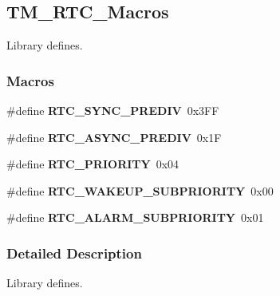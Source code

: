 \hypertarget{group___t_m___r_t_c___macros}{}\subsection{T\+M\+\_\+\+R\+T\+C\+\_\+\+Macros}
\label{group___t_m___r_t_c___macros}


Library defines.  


\subsubsection*{Macros}
\begin{DoxyCompactItemize}
\item 
\hypertarget{group___t_m___r_t_c___macros_gad70ee12b5ccfad457097f59f53fde8c5}{}\#define {\bfseries R\+T\+C\+\_\+\+S\+Y\+N\+C\+\_\+\+P\+R\+E\+D\+I\+V}~0x3\+F\+F\label{group___t_m___r_t_c___macros_gad70ee12b5ccfad457097f59f53fde8c5}

\item 
\hypertarget{group___t_m___r_t_c___macros_ga7b5190a28d7fb1b660e11d4330bd4628}{}\#define {\bfseries R\+T\+C\+\_\+\+A\+S\+Y\+N\+C\+\_\+\+P\+R\+E\+D\+I\+V}~0x1\+F\label{group___t_m___r_t_c___macros_ga7b5190a28d7fb1b660e11d4330bd4628}

\item 
\hypertarget{group___t_m___r_t_c___macros_gae0125126025e8561260aa9653193e6e1}{}\#define {\bfseries R\+T\+C\+\_\+\+P\+R\+I\+O\+R\+I\+T\+Y}~0x04\label{group___t_m___r_t_c___macros_gae0125126025e8561260aa9653193e6e1}

\item 
\hypertarget{group___t_m___r_t_c___macros_ga1b0f4a75390529efcb33839d52e5d381}{}\#define {\bfseries R\+T\+C\+\_\+\+W\+A\+K\+E\+U\+P\+\_\+\+S\+U\+B\+P\+R\+I\+O\+R\+I\+T\+Y}~0x00\label{group___t_m___r_t_c___macros_ga1b0f4a75390529efcb33839d52e5d381}

\item 
\hypertarget{group___t_m___r_t_c___macros_gaa1d615a11548dafb1f4fbc47e69d3a9b}{}\#define {\bfseries R\+T\+C\+\_\+\+A\+L\+A\+R\+M\+\_\+\+S\+U\+B\+P\+R\+I\+O\+R\+I\+T\+Y}~0x01\label{group___t_m___r_t_c___macros_gaa1d615a11548dafb1f4fbc47e69d3a9b}

\end{DoxyCompactItemize}


\subsubsection{Detailed Description}
Library defines. 

